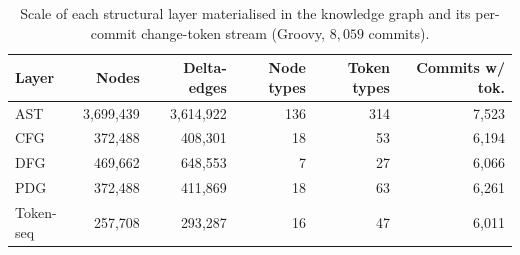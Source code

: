 \documentclass[11pt,a4paper]{article}
\begin{document}
	\begin{table}[t]
	\centering
	\caption{Scale of each structural layer materialised in the knowledge graph and
	its per-commit change-token stream (Groovy, $8{,}059$ commits).}
	\label{tab:v4-layers}
	\begin{tabular}{lrrrrr}
	\toprule
	Layer & Nodes & Delta-edges & Node types & Token types & Commits w/ tok. \\
	\midrule
	AST & 3{,}699{,}439 & 3{,}614{,}922 & 136 & 314 & 7{,}523 \\
	CFG & 372{,}488 & 408{,}301 & 18 & 53 & 6{,}194 \\
	DFG & 469{,}662 & 648{,}553 & 7 & 27 & 6{,}066 \\
	PDG & 372{,}488 & 411{,}869 & 18 & 63 & 6{,}261 \\
	Token-seq & 257{,}708 & 293{,}287 & 16 & 47 & 6{,}011 \\
	\bottomrule
	\end{tabular}
	\end{table}
\end{document}
